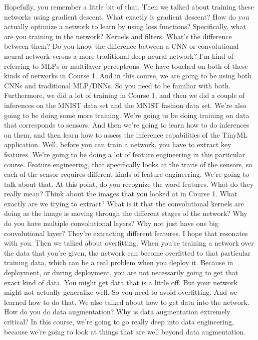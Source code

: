Hopefully, you remember a little bit of that.
Then we talked about training these networks using gradient descent.
What exactly is gradient descent?
How do you actually optimize a network to learn by using loss functions?
Specifically, what are you training in the network?
Kernels and filters.
What's the difference between them?
Do you know the difference between a CNN or convolutional neural network
versus a more traditional deep neural network?
I'm kind of referring to MLPs or multilayer perceptrons.
We have touched on both of these kinds of networks in Course 1.
And in this course, we are going to be using
both CNNs and traditional MLP/DNNs.
So you need to be familiar with both.
Furthermore, we did a lot of training in Course 1,
and then we did a couple of inferences on the MNIST data set and the MNIST
fashion data set.
We're also going to be doing some more training.
We're going to be doing training on data that corresponds to sensors.
And then we're going to learn how to do inferences on them,
and then learn how to assess the inference capabilities of the TinyML
application.
Well, before you can train a network, you have to extract key features.
We're going to be doing a lot of feature engineering in this particular course.
Feature engineering, that specifically looks at the traits of the sensors,
so each of the sensor requires different kinds of feature engineering.
We're going to talk about that.
At this point, do you recognize the word features.
What do they really mean?
Think about the images that you looked at in Course 1.
What exactly are we trying to extract?
What is it that the convolutional kernels
are doing as the image is moving through the different stages of the network?
Why do you have multiple convolutional layers?
Why not just have one big convolutional layer?
They're extracting different features.
I hope that resonates with you.
Then we talked about overfitting.
When you're training a network over the data that you're given,
the network can become overfitted to that particular training
data, which can be a real problem when you deploy it.
Because in deployment, or during deployment,
you are not necessarily going to get that exact kind of data.
You might get data that is a little off.
But your network might not actually generalize well.
So you need to avoid overfitting.
And we learned how to do that.
We also talked about how to get data into the network.
How do you do data augmentation?
Why is data augmentation extremely critical?
In this course, we're going to go really deep into data engineering,
because we're going to look at things that are well beyond data augmentation.
